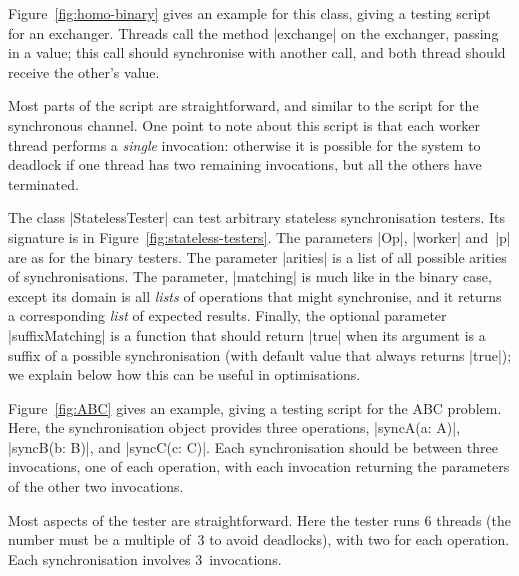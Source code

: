 
Figure~\ref{fig:homo-binary} gives an example for this class, giving a testing
script for an exchanger.  Threads call the method |exchange| on the exchanger,
passing in a value; this call should synchronise with another call, and both
thread should receive the other's value.  

Most parts of the script are straightforward, and similar to the script for
the synchronous channel.  One point to note about this script is that each
worker thread performs a \emph{single} invocation: otherwise it is possible
for the system to deadlock if one thread has two remaining invocations, but
all the others have terminated.
 

The class |StatelessTester| can test arbitrary stateless synchronisation
testers.  Its signature is in Figure~\ref{fig:stateless-testers}.
%
The parameters |Op|, |worker| and~|p| are as for the binary testers.  The
parameter |arities| is a list of all possible arities of synchronisations.
The parameter, |matching| is much like in the binary case, except its domain
is all \emph{lists} of operations that might synchronise, and it returns a
corresponding \emph{list} of expected results.  Finally, the optional
parameter |suffixMatching| is a function that should return |true| when its
argument is a suffix of a possible synchronisation (with default value that
always returns |true|); we explain below how this can be useful in
optimisations.


Figure~\ref{fig:ABC} gives an example, giving a testing script for the ABC
problem.  Here, the synchronisation object provides three operations,
|syncA(a: A)|, |syncB(b: B)|, and |syncC(c: C)|.  Each synchronisation should
be between three invocations, one of each operation, with each invocation
returning the parameters of the other two invocations.

Most aspects of the tester are straightforward.  Here the tester runs 6
threads (the number must be a multiple of~3 to avoid deadlocks), with two for
each operation.  Each synchronisation involves 3~invocations.

